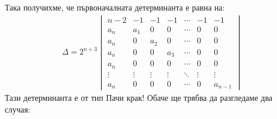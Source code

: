 \documentclass[a4paper, 12pt, oneside]{article}
\begin{document}
Така получихме, че първоначалната детерминанта е равна на:
\begin{align*}
\Delta = 2^{n + 3}\begin{vmatrix}
    n - 2 & -1   & -1   & -1   & \cdots & -1  & -1 \\
    a_n   & a_1 & 0   & 0   & \cdots & 0 & 0 \\
    a_n   & 0   & a_2 & 0   & \cdots & 0 & 0 \\
    a_n   & 0   & 0   & a_3 & \cdots & 0 & 0 \\
    a_n   & 0   & 0   & 0   & \cdots & 0 & 0 \\
    \vdots & \vdots & \vdots & \vdots & \ddots & \vdots & \vdots \\
    a_n & 0 & 0 & 0 & \cdots & 0 & a_{n - 1}
\end{vmatrix}
\end{align*}
Тази детерминанта е от тип Пачи крак! Обаче ще трябва да разгледаме два случая:
\end{document}
